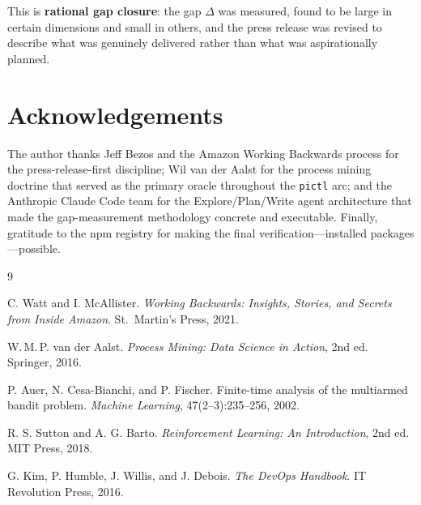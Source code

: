 \documentclass[11pt,a4paper]{article}
\newcommand{\code}[1]{\texttt{#1}}
\begin{document}
This is \textbf{rational gap closure}: the gap $\Delta$ was measured, found to be large in certain dimensions and small in others, and the press release was revised to describe what was genuinely delivered rather than what was aspirationally planned.

\section*{Acknowledgements}

The author thanks Jeff Bezos and the Amazon Working Backwards process for the
press-release-first discipline; Wil van der Aalst for the process mining
doctrine that served as the primary oracle throughout the \code{pictl} arc; and
the Anthropic Claude Code team for the Explore/Plan/Write agent architecture
that made the gap-measurement methodology concrete and executable. Finally, gratitude to the npm registry for making the final verification—installed packages—possible.

\begin{thebibliography}{9}

C. Watt and I. McAllister.
\textit{Working Backwards: Insights, Stories, and Secrets from Inside Amazon}.
St.\ Martin's Press, 2021.

W.\,M.\,P. van der Aalst.
\textit{Process Mining: Data Science in Action}, 2nd ed.
Springer, 2016.

P. Auer, N. Cesa-Bianchi, and P. Fischer.
Finite-time analysis of the multiarmed bandit problem.
\textit{Machine Learning}, 47(2--3):235--256, 2002.

R. S. Sutton and A. G. Barto.
\textit{Reinforcement Learning: An Introduction}, 2nd ed.
MIT Press, 2018.

G. Kim, P. Humble, J. Willis, and J. Debois.
\textit{The DevOps Handbook}.
IT Revolution Press, 2016.

\end{thebibliography}
\end{document}
